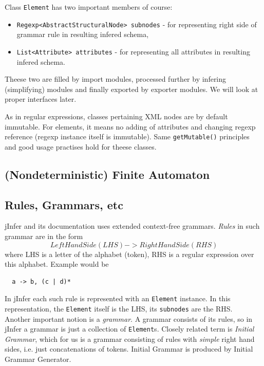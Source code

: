 \documentclass[a4paper,10pt,oneside]{article}
\newcommand{\code}[1]{\texttt{#1}}
\begin{document}
Class \code{Element} has two important members of course:
\begin{itemize}
	\item \code{Regexp<AbstractStructuralNode> subnodes} - for representing right side of grammar rule in resulting infered schema,
	\item \code{List<Attribute> attributes} - for representing all attributes in resulting infered schema.
\end{itemize}
Theese two are filled by import modules, processed further by infering (simplifying) modules and finally exported by exporter modules. We will look at proper interfaces later.

As in regular expressions, classes pertaining XML nodes are by default immutable.
For elements, it means no adding of attributes and changing regexp reference (regexp instance itself is immutable).
Same \code{getMutable()} principles and good usage practises hold for theese classes.

\subsection{(Nondeterministic) Finite Automaton}

\subsection{Rules, Grammars, etc}

jInfer and its documentation uses extended context-free grammars. %
\textit{Rules} in such grammar are in the form
\[  Left Hand Side (LHS)  -> Right Hand Side (RHS) \]
where LHS is a letter of the alphabet (token), RHS is a regular expression over this alphabet. Example would be
\begin{verbatim}
  a -> b, (c | d)*
\end{verbatim}

In jInfer each such rule is represented with an \code{Element} instance. In this representation, the \code{Element} itself is the LHS, its \code{subnodes} are the RHS.\\

Another important notion is a \textit{grammar}. A grammar consists of its rules, so in jInfer a grammar is just a collection of \code{Element}s. Closely related term is \textit{Initial Grammar}, which for us is a grammar consisting of rules with \textit{simple} right hand sides, i.e. just concatenations of tokens. Initial Grammar is produced by Initial Grammar Generator. %
\end{document}
